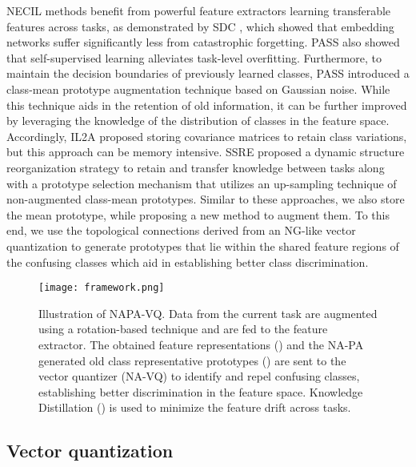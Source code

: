 \documentclass[10pt,twocolumn,letterpaper]{article}
\begin{document}
NECIL methods benefit from powerful feature extractors learning transferable features across tasks, as demonstrated by SDC \cite{Yu2020}, which showed that embedding networks suffer significantly less from catastrophic forgetting. PASS \cite{Zhu2021PrototypeLearning} also showed that self-supervised learning alleviates task-level overfitting. Furthermore, to maintain the decision boundaries of previously learned classes, PASS introduced a class-mean prototype augmentation technique based on Gaussian noise. While this technique aids in the retention of old information, it can be further improved by leveraging the knowledge of the distribution of classes in the feature space. Accordingly, IL2A \cite{Zhu2021Class-IncrementalAugmentation} proposed storing covariance matrices to retain class variations, but this approach can be memory intensive. SSRE \cite{Zhu2022Self-SustainingLearning} proposed a dynamic structure reorganization strategy to retain and transfer knowledge between tasks along with a prototype selection mechanism that utilizes an up-sampling technique of non-augmented class-mean prototypes. Similar to these approaches, we also store the mean prototype, while proposing a new method to augment them. To this end, we use the topological connections derived from an NG-like vector quantization to generate prototypes that lie within the shared feature regions of the confusing classes which aid in establishing better class discrimination.











\begin{figure*}[t]
\centering
\texttt{[image: 
framework.png]}
\caption{Illustration of NAPA-VQ. Data from the current task  are augmented using a rotation-based technique \cite{Zhu2021PrototypeLearning} and are fed to the feature extractor.
The obtained feature representations () and the NA-PA generated old class representative prototypes () are sent to the vector quantizer (NA-VQ) to identify and repel confusing classes, establishing better discrimination in the feature space. 
Knowledge Distillation () is used to minimize the feature drift across tasks.}\label{fig:framework}
\end{figure*} 

\subsection{Vector quantization}
\end{document}
